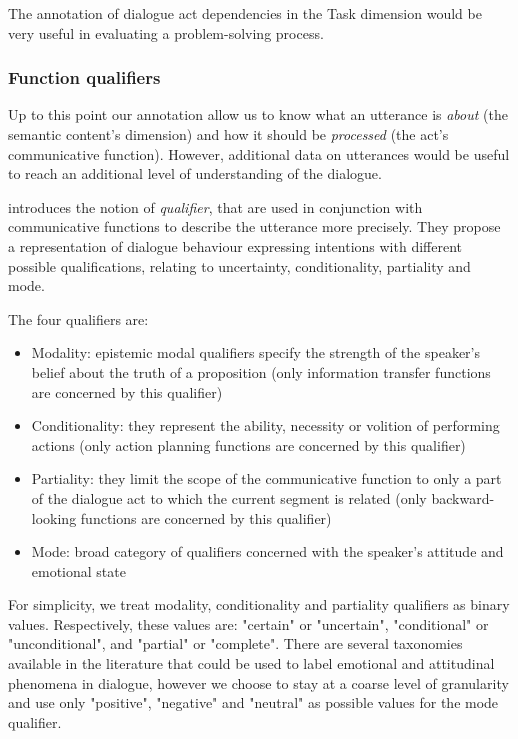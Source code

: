 The annotation of dialogue act dependencies in the Task dimension would be very useful in evaluating a problem-solving process.

\subsubsection{Function qualifiers}

Up to this point our annotation allow us to know what an utterance is \textit{about} (the semantic content's dimension) and how it should be \textit{processed} (the act's communicative function). However, additional data on utterances would be useful to reach an additional level of understanding of the dialogue. 

\cite{petukhova2010introducing} introduces the notion of \textit{qualifier}, that are used in conjunction with communicative functions to describe the utterance more precisely. They propose a representation of dialogue behaviour expressing intentions with different possible qualifications, relating to uncertainty, conditionality, partiality and mode.

The four qualifiers are:

\begin{itemize}
	\item Modality: epistemic modal qualifiers specify the strength of the speaker's belief about the truth of a proposition (only information transfer functions are concerned by this qualifier)
	\item Conditionality: they represent the ability, necessity or volition of performing actions (only action planning functions are concerned by this qualifier)
	\item Partiality: they limit the scope of the communicative function to only a part of the dialogue act to which the current segment is related (only backward-looking functions are concerned by this qualifier)
	\item Mode: broad category of qualifiers concerned with the speaker's attitude and emotional state
\end{itemize}

For simplicity, we treat modality, conditionality and partiality qualifiers as binary values. Respectively, these values are: "certain" or "uncertain", "conditional" or "unconditional", and "partial" or "complete". There are several taxonomies available in the literature that could be used to label emotional and attitudinal phenomena in dialogue, however we choose to stay at a coarse level of granularity and use only "positive", "negative" and "neutral" as possible values for the mode qualifier.

